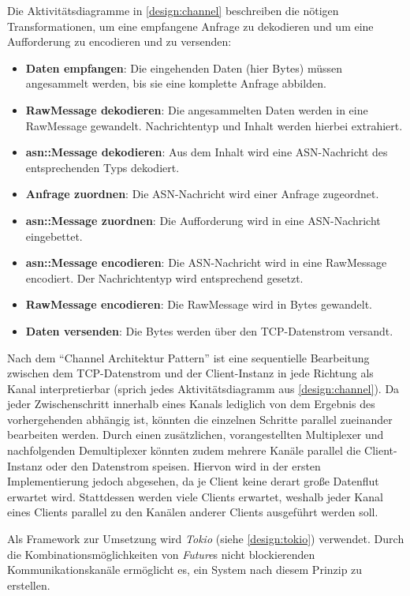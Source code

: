 Die Aktivitätsdiagramme in \autoref{design:channel} beschreiben die nötigen Transformationen, um eine empfangene Anfrage zu dekodieren und um eine Aufforderung zu encodieren und zu versenden:

\begin{itemize}
	\item \textbf{Daten empfangen}: Die eingehenden Daten (hier Bytes) müssen angesammelt werden, bis sie eine komplette Anfrage abbilden.
	\item \textbf{RawMessage dekodieren}: Die angesammelten Daten werden in eine RawMessage gewandelt. Nachrichtentyp und Inhalt werden hierbei extrahiert.
	\item \textbf{asn::Message dekodieren}: Aus dem Inhalt wird eine ASN-Nachricht des entsprechenden Typs dekodiert.
	\item \textbf{Anfrage zuordnen}: Die ASN-Nachricht wird einer Anfrage zugeordnet.
	\item \textbf{asn::Message zuordnen}: Die Aufforderung wird in eine ASN-Nachricht eingebettet.
	\item \textbf{asn::Message encodieren}: Die ASN-Nachricht wird in eine RawMessage encodiert. Der Nachrichtentyp wird entsprechend gesetzt.
	\item \textbf{RawMessage encodieren}: Die RawMessage wird in Bytes gewandelt.
	\item \textbf{Daten versenden}: Die Bytes werden über den TCP-Datenstrom versandt.
\end{itemize}

Nach dem \enquote{Channel Architektur Pattern} ist eine sequentielle Bearbeitung zwischen dem TCP-Datenstrom und der Client-Instanz in jede Richtung als Kanal interpretierbar (sprich jedes Aktivitätsdiagramm aus \autoref{design:channel}).
Da jeder Zwischenschritt innerhalb eines Kanals lediglich von dem Ergebnis des vorhergehenden abhängig ist, könnten die einzelnen Schritte parallel zueinander bearbeiten werden.
Durch einen zusätzlichen, vorangestellten Multiplexer und nachfolgenden Demultiplexer könnten zudem mehrere Kanäle parallel die Client-Instanz oder den Datenstrom speisen.
Hiervon wird in der ersten Implementierung jedoch abgesehen, da je Client keine derart große Datenflut erwartet wird.
Stattdessen werden viele Clients erwartet, weshalb jeder Kanal eines Clients parallel zu den Kanälen anderer Clients ausgeführt werden soll.

Als Framework zur Umsetzung wird \textit{Tokio} (siehe \autoref{design:tokio}) verwendet.
Durch die Kombinationsmöglichkeiten von \textit{Future}s nicht blockierenden Kommunikationskanäle ermöglicht es, ein System nach diesem Prinzip zu erstellen.

